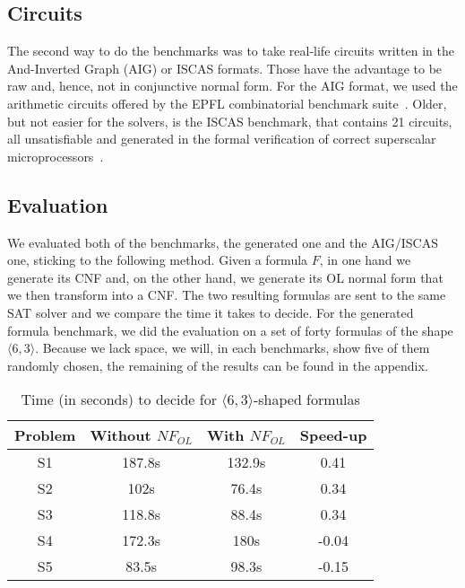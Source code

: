 \documentclass[a4paper, 11pt]{article}
\begin{document}
    \subsection{Circuits}
    The second way to do the benchmarks was to take real-life circuits written in the
    And-Inverted Graph (AIG) or ISCAS formats. Those have the advantage to be raw and, hence, not in 
    conjunctive normal form. For the AIG format, we used the arithmetic circuits offered by the EPFL 
    combinatorial benchmark suite~\cite{item_309aea67b5a145328a6f0a141d8f1ab3}. Older, but not easier for
    the solvers, is the ISCAS benchmark, that contains 21 circuits, all unsatisfiable and generated in 
    the formal verification of correct superscalar microprocessors~\cite{velev}.
    \subsection{Evaluation}
    We evaluated both of the benchmarks, the generated one and the AIG/ISCAS one, sticking to the
    following method. Given a formula $F$, in one hand we generate its CNF and, on the other hand,
    we generate its OL normal form that we then transform into a CNF. The two resulting formulas are
    sent to the same SAT solver and we compare the time it takes to decide. For the generated formula
    benchmark, we did the evaluation on a set of forty formulas of the shape $\langle6,3\rangle$. Because
    we lack space, we will, in each benchmarks, show five of them randomly chosen, the remaining of the 
    results can be found in the appendix.
    \begin{table}[h]
	    \begin{center} 
		    \begin{tabular}{|| c || c c c||}
		    \hline
			    Problem&Without $NF_{OL}$&With $NF_{OL}$&Speed-up\\
			    \hline
			    S1 & 187.8s & 132.9s&0.41\\\hline
			    S2 & 102s & 76.4s&0.34\\\hline 
			    S3 & 118.8s & 88.4s&0.34\\\hline 
			    S4 & 172.3s & 180s&-0.04\\\hline
			    S5 & 83.5s & 98.3s&-0.15\\\hline  
		    \end{tabular}
		    \caption{Time (in seconds) to decide for $\langle 6,3\rangle$-shaped formulas}
	    \end{center}
    \end{table}
\end{document}
